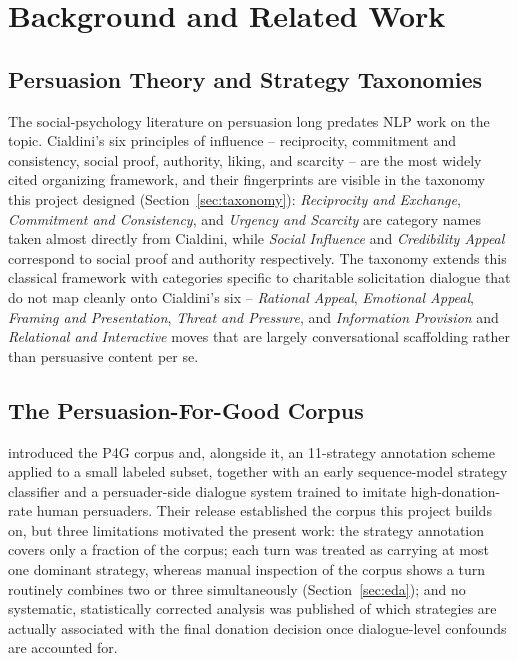 \chapter{Background and Related Work}
\label{ch:research}

\section{Persuasion Theory and Strategy Taxonomies}

The social-psychology literature on persuasion long predates NLP work on the
topic. Cialdini's six principles of influence -- reciprocity, commitment and
consistency, social proof, authority, liking, and scarcity
\citep{cialdini1984influence} -- are the most widely cited organizing
framework, and their fingerprints are visible in the taxonomy this project
designed (Section~\ref{sec:taxonomy}): \emph{Reciprocity and Exchange},
\emph{Commitment and Consistency}, and \emph{Urgency and Scarcity} are
category names taken almost directly from Cialdini, while \emph{Social
Influence} and \emph{Credibility Appeal} correspond to social proof and
authority respectively. The taxonomy extends this classical framework with
categories specific to charitable solicitation dialogue that do not map
cleanly onto Cialdini's six -- \emph{Rational Appeal}, \emph{Emotional
Appeal}, \emph{Framing and Presentation}, \emph{Threat and Pressure}, and
\emph{Information Provision} and \emph{Relational and Interactive} moves that
are largely conversational scaffolding rather than persuasive content per se.

\section{The Persuasion-For-Good Corpus}

\citet{wang2019persuasion} introduced the P4G corpus and, alongside it, an
11-strategy annotation scheme applied to a small labeled subset, together
with an early sequence-model strategy classifier and a persuader-side
dialogue system trained to imitate high-donation-rate human persuaders. Their
release established the corpus this project builds on, but three limitations
motivated the present work: the strategy annotation covers only a fraction of
the corpus; each turn was treated as carrying at most one dominant strategy,
whereas manual inspection of the corpus shows a turn routinely combines two
or three simultaneously (Section~\ref{sec:eda}); and no systematic,
statistically corrected analysis was published of which strategies are
actually associated with the final donation decision once dialogue-level
confounds are accounted for.


